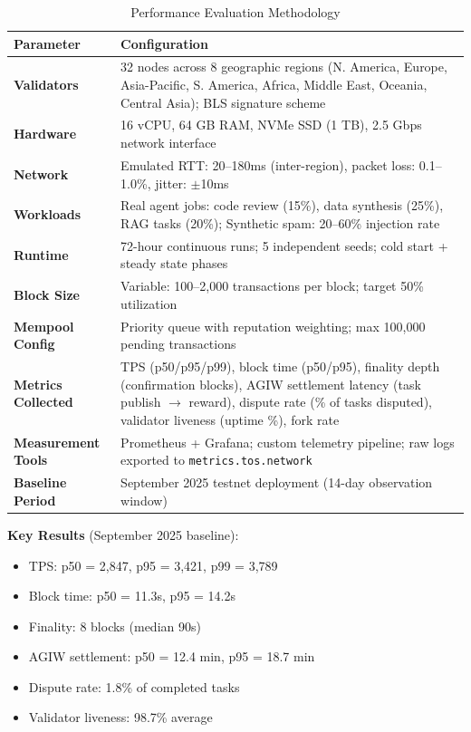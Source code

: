 \documentclass[11pt]{article}
\begin{document}
\begin{table}[H]
\centering
\caption{Performance Evaluation Methodology}
\label{tab:evaluation-methodology}
\begin{tabular}{@{}p{}p{}@{}}
\toprule
\textbf{Parameter} & \textbf{Configuration} \\ \midrule
\textbf{Validators} & 32 nodes across 8 geographic regions (N. America, Europe, Asia-Pacific, S. America, Africa, Middle East, Oceania, Central Asia); BLS signature scheme \\
\textbf{Hardware} & 16 vCPU, 64 GB RAM, NVMe SSD (1 TB), 2.5 Gbps network interface \\
\textbf{Network} & Emulated RTT: 20--180ms (inter-region), packet loss: 0.1--1.0\%, jitter: $\pm$10ms \\
\textbf{Workloads} & Real agent jobs: code review (15\%), data synthesis (25\%), RAG tasks (20\%); Synthetic spam: 20--60\% injection rate \\
\textbf{Runtime} & 72-hour continuous runs; 5 independent seeds; cold start + steady state phases \\
\textbf{Block Size} & Variable: 100--2,000 transactions per block; target 50\% utilization \\
\textbf{Mempool Config} & Priority queue with reputation weighting; max 100,000 pending transactions \\
\textbf{Metrics Collected} & TPS (p50/p95/p99), block time (p50/p95), finality depth (confirmation blocks), AGIW settlement latency (task publish $\rightarrow$ reward), dispute rate (\% of tasks disputed), validator liveness (uptime \%), fork rate \\
\textbf{Measurement Tools} & Prometheus + Grafana; custom telemetry pipeline; raw logs exported to \texttt{metrics.tos.network} \\
\textbf{Baseline Period} & September 2025 testnet deployment (14-day observation window) \\
\bottomrule
\end{tabular}
\end{table}

\textbf{Key Results} (September 2025 baseline):
\begin{itemize}[noitemsep]
  \item TPS: p50 = 2,847, p95 = 3,421, p99 = 3,789
  \item Block time: p50 = 11.3s, p95 = 14.2s
  \item Finality: 8 blocks (median 90s)
  \item AGIW settlement: p50 = 12.4 min, p95 = 18.7 min
  \item Dispute rate: 1.8\% of completed tasks
  \item Validator liveness: 98.7\% average
\end{itemize}
\end{document}
